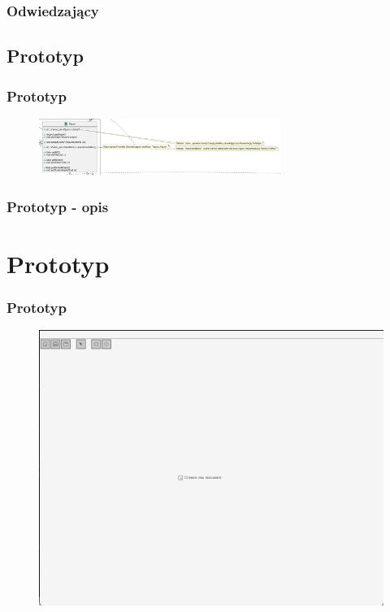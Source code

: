 \documentclass[
	11pt,]{beamer}
\begin{document}
\begin{frame}
	\frametitle{Odwiedzający}
	
\end{frame}

\subsection{Prototyp}

\begin{frame}
	\frametitle{Prototyp}
	\begin{figure}
		\includegraphics[width=0.7\textwidth]{figures/prototyp.pdf}
	\end{figure}
\end{frame}

\begin{frame}
	\frametitle{Prototyp - opis}

\end{frame}


\section{Prototyp}

\begin{frame}
	\frametitle{Prototyp}
	
	\begin{figure}
		\includegraphics[height=0.7\textheight]{figures/pro1.png}
	\end{figure}
\end{frame}
\end{document}
